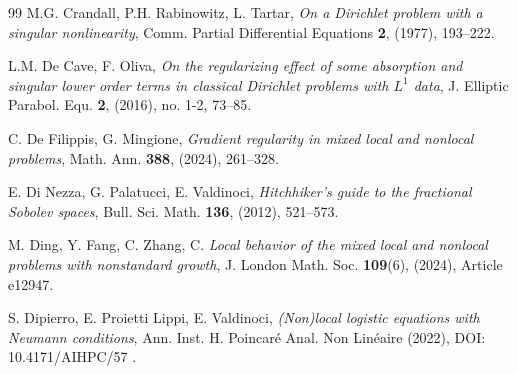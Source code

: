 \documentclass[11pt,a4paper]{amsart}
\theoremstyle{definition}
\theoremstyle{plain}
\numberwithin{equation}{section}
\begin{document}
{\begin{thebibliography}{99}
M.G. Crandall, P.H. Rabinowitz, L. Tartar,
{\em On a Dirichlet problem with a singular nonlinearity},
Comm. Partial Differential Equations {\bf 2}, (1977), 193--222.




L.M. De Cave, F. Oliva, 
{\em On the regularizing effect of some absorption and singular lower order terms in classical Dirichlet problems with $L^1$ data},
J. Elliptic Parabol. Equ. {\bf 2}, (2016), no. 1-2, 73--85.

 C. De Filippis, G. Mingione, 
 {\em Gradient regularity in mixed local and nonlocal problems}, 
 Math. Ann. {\bf 388}, (2024), 261--328.


E. Di Nezza, G. Palatucci, E. Valdinoci,
{\em Hitchhiker's guide to the fractional Sobolev spaces}, 
Bull. Sci. Math. {\bf 136}, (2012), 521--573.


M. Ding, Y. Fang, C. Zhang, C. 
{\em Local behavior of the mixed local and nonlocal problems with nonstandard growth}, 
J. London Math. Soc. {\bf 109}(6), (2024), Article e12947.


S. Dipierro, E. Proietti Lippi, E. Valdinoci, 
{\em (Non)local logistic equations with Neumann conditions}, Ann. Inst. H. Poincaré Anal. Non Linéaire (2022), 
DOI: 10.4171/AIHPC/57 .


\end{thebibliography}}
\end{document}
